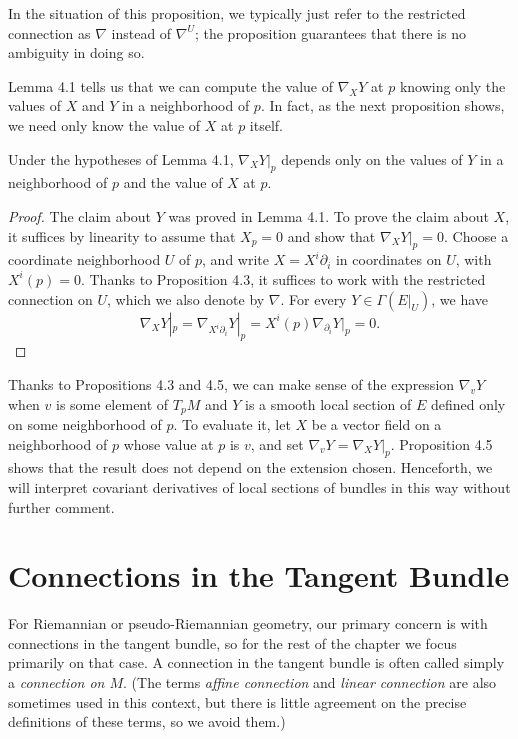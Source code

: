In the situation of this proposition, we typically just refer to the restricted connection as $\nabla$ instead of $\nabla^U$; the proposition guarantees that there is no ambiguity in doing so.

Lemma 4.1 tells us that we can compute the value of $\nabla_X Y$ at $p$ knowing only the values of $X$ and $Y$ in a neighborhood of $p$. In fact, as the next proposition shows, we need only know the value of $X$ at $p$ itself.

\begin{proposition}\label{prop:covariant-deriv-dependence-at-point}
\leanok
Under the hypotheses of Lemma 4.1, $\nabla_X Y|_p$ depends only on the values of $Y$ in a neighborhood of $p$ and the value of $X$ at $p$.
\end{proposition}

\begin{proof}
\leanok
The claim about $Y$ was proved in Lemma 4.1. To prove the claim about $X$, it suffices by linearity to assume that $X_p = 0$ and show that $\nabla_X Y|_p = 0$. Choose a coordinate neighborhood $U$ of $p$, and write $X = X^i \partial_i$ in coordinates on $U$, with $X^i(p) = 0$. Thanks to Proposition 4.3, it suffices to work with the restricted connection on $U$, which we also denote by $\nabla$. For every $Y \in \Gamma(E|_U)$, we have
\[
\nabla_X Y|_p = \nabla_{X^i \partial_i} Y|_p = X^i(p)\nabla_{\partial_i} Y|_p = 0.
\]
\end{proof}

Thanks to Propositions 4.3 and 4.5, we can make sense of the expression $\nabla_v Y$ when $v$ is some element of $T_p M$ and $Y$ is a smooth local section of $E$ defined only on some neighborhood of $p$. To evaluate it, let $X$ be a vector field on a neighborhood of $p$ whose value at $p$ is $v$, and set $\nabla_v Y = \nabla_X Y|_p$. Proposition 4.5 shows that the result does not depend on the extension chosen. Henceforth, we will interpret covariant derivatives of local sections of bundles in this way without further comment.

\section{Connections in the Tangent Bundle}

For Riemannian or pseudo-Riemannian geometry, our primary concern is with connections in the tangent bundle, so for the rest of the chapter we focus primarily on that case. A connection in the tangent bundle is often called simply a \emph{connection on $M$}. (The terms \emph{affine connection} and \emph{linear connection} are also sometimes used in this context, but there is little agreement on the precise definitions of these terms, so we avoid them.)

